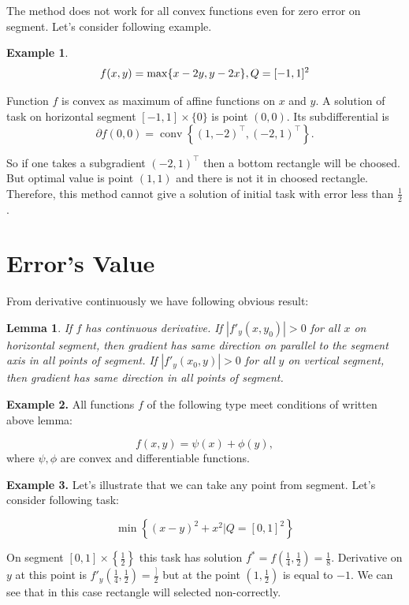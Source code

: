 \documentclass[12pt]{article}
\DeclareMathOperator{\conv}{conv}
\newtheorem{lemma}{Lemma}
\begin{document}
The method does not work for all convex functions even for zero error on segment. Let's consider following example.

\textbf{Example 1}.
\begin{equation}
f(x,y) = \max\{x-2y, y-2x\}, \\
Q = [-1, 1]^2
\end{equation}

Function $f$ is convex as maximum of affine functions on $x$ and $y$. A solution of task on horizontal segment $[-1, 1]\times\{0\}$ is point $(0, 0)$. Its subdifferential is $$\partial f(0,0) = \conv\left\{(1, -2)^\top, (-2,1)^\top\right\}.$$ 

So if one takes a subgradient $(-2, 1)^\top$ then a bottom rectangle will be choosed. But optimal value is point $(1,1)$ and there is not it in choosed rectangle. Therefore, this method cannot give a solution of initial task with error less than $\frac{1}{2}$.

\section{Error's Value}

From derivative continuously we have following obvious result:

\begin{lemma}
If $f$ has continuous derivative. If $|f'_y(x, y_0)| > 0$ for all $x$ on horizontal segment, then gradient has same direction on parallel to the segment axis  in all points of segment. If $|f'_y(x_0, y)| > 0$ for all $y$ on vertical segment, then gradient has same direction in all points of segment.
\end{lemma}

\textbf{Example 2.} All functions $f$ of the following type meet conditions of written above lemma:

$$f(x, y) = \psi(x) + \phi(y),$$
where $\psi, \phi$ are convex and differentiable functions.

\textbf{Example 3.} Let's illustrate that we can take any point from segment. Let's consider following task:

$$\min\left\{(x-y)^2 + x^2\Big|Q = [0,1]^2\right\}$$

On segment $[0,1]\times\left\{\frac{1}{2}\right\}$ this task has solution $f^* = f\left(\frac{1}{4}, \frac{1}{2}\right) = \frac{1}{8}$. Derivative on $y$ at this point is $f'_y\left(\frac{1}{4}, \frac{1}{2}\right) = \frac{]}{2}$ but at the point $\left(1, \frac{1}{2}\right)$ is equal to $-1$. We can see that in this case rectangle will selected non-correctly.
\end{document}
